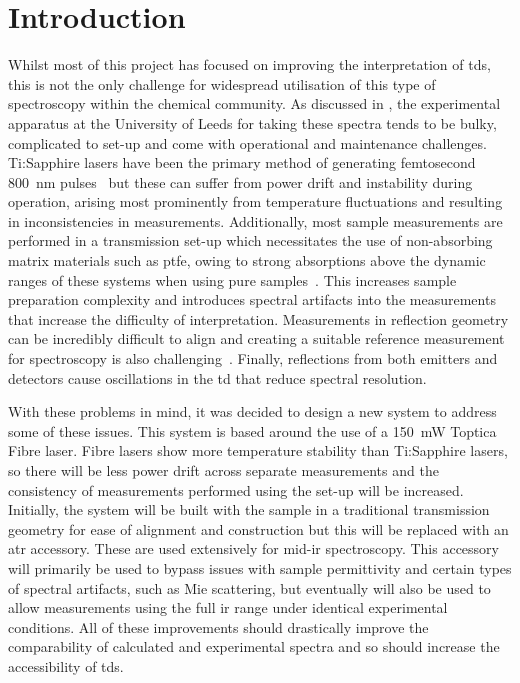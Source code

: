 \section{Introduction}
Whilst most of this project has focused on improving the interpretation of \acrshort{tds}, this is not the only challenge for widespread utilisation of this type of spectroscopy within the chemical community. As discussed in , the experimental apparatus at the University of Leeds for taking these spectra tends to be bulky, complicated to set\nobreakdash-up and come with operational and maintenance challenges. Ti:Sapphire lasers have been the primary method of generating femtosecond \SI{800}{nm} pulses~\cite{Druon2007} but these can suffer from power drift and instability during operation, arising most prominently from temperature fluctuations and resulting in inconsistencies in measurements. Additionally, most sample measurements are performed in a transmission set\nobreakdash-up which necessitates the use of non\nobreakdash-absorbing matrix materials such as \acrshort{ptfe}, owing to strong absorptions above the dynamic ranges of these systems when using pure samples~\cite{Zeitler2016, Smith2011, Murphy2022}. This increases sample preparation complexity and introduces spectral artifacts into the measurements that increase the difficulty of interpretation. Measurements in reflection geometry can be incredibly difficult to align and creating a suitable reference measurement for spectroscopy is also challenging~\cite{Smith2011}. Finally, reflections from both emitters and detectors cause oscillations in the \acrshort{td} that reduce spectral resolution.

With these problems in mind, it was decided to design a new system to address some of these issues. This system is based around the use of a \SI{150}{mW} Toptica Fibre laser. Fibre lasers show more temperature stability than Ti:Sapphire lasers, so there will be less power drift across separate measurements and the consistency of measurements performed using the set\nobreakdash-up will be increased. Initially, the system will be built with the sample in a traditional transmission geometry for ease of alignment and construction but this will be replaced with an \acrfull{atr} accessory. These are used extensively for mid\nobreakdash-\acrshort{ir} spectroscopy. This accessory will primarily be used to bypass issues with sample permittivity and certain types of spectral artifacts, such as Mie scattering, but eventually will also be used to allow measurements using the full \acrshort{ir} range under identical experimental conditions. All of these improvements should drastically improve the comparability of calculated and experimental spectra and so should increase the accessibility of \acrshort{tds}. 


